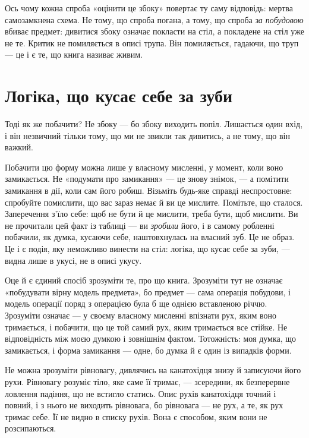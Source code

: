 \documentclass[12pt, a4paper, openany]{book}
\begin{document}
Ось чому кожна спроба «оцінити це збоку» повертає ту саму відповідь: мертва самозамкнена схема. Не тому, що спроба погана, а тому, що спроба \emph{за побудовою} вбиває предмет: дивитися збоку означає покласти на стіл, а покладене на стіл уже не те. Критик не помиляється в описі трупа. Він помиляється, гадаючи, що труп --- це і є те, що книга називає живим.

\section{Логіка, що кусає себе за зуби}

Тоді як же побачити? Не збоку --- бо збоку виходить попіл. Лишається один вхід, і він незвичний тільки тому, що ми не звикли так дивитись, а не тому, що він важкий.

Побачити цю форму можна лише у власному мисленні, у момент, коли воно замикається. Не «подумати про замикання» --- це знову знімок, --- а помітити замикання в дії, коли сам його робиш. Візьміть будь-яке справді неспростовне: спробуйте помислити, що вас зараз немає й ви це мислите. Помітьте, що сталося. Заперечення з'їло себе: щоб не бути й це мислити, треба бути, щоб мислити. Ви не прочитали цей факт із таблиці --- ви \emph{зробили} його, і в самому робленні побачили, як думка, кусаючи себе, наштовхнулась на власний зуб. Це не образ. Це і є подія, яку неможливо винести на стіл: логіка, що кусає себе за зуби, --- видна лише в укусі, не в описі укусу.

Оце й є єдиний спосіб зрозуміти те, про що книга. Зрозуміти тут не означає «побудувати вірну модель предмета», бо предмет --- сама операція побудови, і модель операції поряд з операцією була б ще однією вставленою річчю. Зрозуміти означає --- у своєму власному мисленні впізнати рух, яким воно тримається, і побачити, що це той самий рух, яким тримається все стійке. Не відповідність між моєю думкою і зовнішнім фактом. Тотожність: моя думка, що замикається, і форма замикання --- одне, бо думка й є один із випадків форми.

\begin{analogybox}
Не можна зрозуміти рівновагу, дивлячись на канатохідця знизу й записуючи його рухи. Рівновагу розуміє тіло, яке саме її тримає, --- зсередини, як безперервне ловлення падіння, що не встигло статись. Опис рухів канатохідця точний і повний, і з нього не виходить рівновага, бо рівновага --- не рух, а те, як рух тримає себе. Її не видно в списку рухів. Вона є способом, яким вони не розсипаються.
\end{analogybox}
\end{document}
